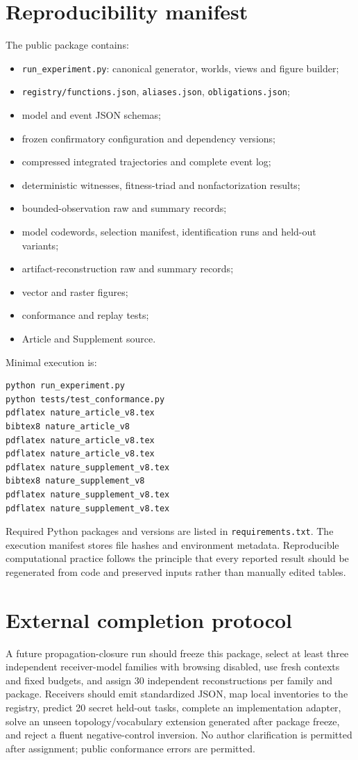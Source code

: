 \documentclass[10pt]{article}
\begin{document}


\section{Reproducibility manifest}
The public package contains:
\begin{itemize}
\item \texttt{run\_experiment.py}: canonical generator, worlds, views and figure builder;
\item \texttt{registry/functions.json}, \texttt{aliases.json}, \texttt{obligations.json};
\item model and event JSON schemas;
\item frozen confirmatory configuration and dependency versions;
\item compressed integrated trajectories and complete event log;
\item deterministic witnesses, fitness-triad and nonfactorization results;
\item bounded-observation raw and summary records;
\item model codewords, selection manifest, identification runs and held-out variants;
\item artifact-reconstruction raw and summary records;
\item vector and raster figures;
\item conformance and replay tests;
\item Article and Supplement source.
\end{itemize}

Minimal execution is:
\begin{verbatim}
python run_experiment.py
python tests/test_conformance.py
pdflatex nature_article_v8.tex
bibtex8 nature_article_v8
pdflatex nature_article_v8.tex
pdflatex nature_article_v8.tex
pdflatex nature_supplement_v8.tex
bibtex8 nature_supplement_v8
pdflatex nature_supplement_v8.tex
pdflatex nature_supplement_v8.tex
\end{verbatim}
Required Python packages and versions are listed in \texttt{requirements.txt}. The execution manifest stores file hashes and environment metadata. Reproducible computational practice follows the principle that every reported result should be regenerated from code and preserved inputs rather than manually edited tables\citep{sandve2013}.

\section{External completion protocol}
A future propagation-closure run should freeze this package, select at least three independent receiver-model families with browsing disabled, use fresh contexts and fixed budgets, and assign 30 independent reconstructions per family and package. Receivers should emit standardized JSON, map local inventories to the registry, predict 20 secret held-out tasks, complete an implementation adapter, solve an unseen topology/vocabulary extension generated after package freeze, and reject a fluent negative-control inversion. No author clarification is permitted after assignment; public conformance errors are permitted.
\end{document}
